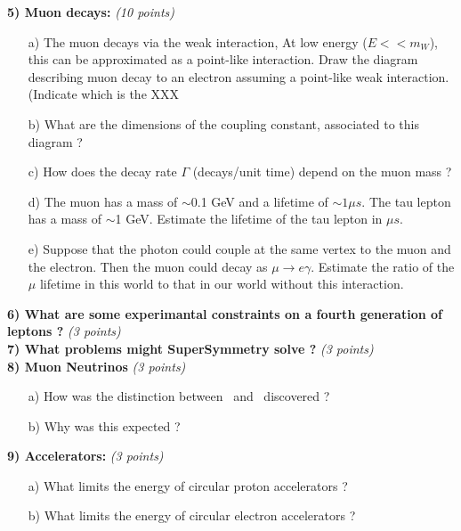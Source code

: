 {%

\textbf{5) Muon decays: } \hfill \textit{(10 points)}\\
\begin{itemize}
  \item[a)]{ The muon decays via the weak interaction,  At low energy ($E << m_W$), this can be approximated as a point-like interaction. 
  Draw the diagram describing muon decay to an electron assuming a point-like weak interaction. (Indicate which is the XXX
\vspace*{1.5in}
}
  \item[b)]{ What are the dimensions of the coupling constant, associated to this diagram  ?
\vspace*{1.0in}
  }
  \item[c)] How does the decay rate $\Gamma$ (decays/unit time)  depend on the muon mass ? 
\vspace*{1.0in}
  \item[d)]{ The muon has a mass of $\sim$0.1 GeV and a lifetime of $\sim 1 \mu s$. The tau lepton has a mass of {$\sim$1 GeV}. Estimate the lifetime of the tau lepton in $\mu s$.
\vspace*{2.4in}
}
  \item[e)] {Suppose that the photon could couple at the same vertex to the muon and the electron. Then the muon could decay as $\mu\rightarrow e \gamma$. 
  Estimate the ratio of the $\mu$ lifetime in this world to that in our world without this interaction.
  \vspace*{3.0in}
  }
\end{itemize}


\textbf{6) What are some experimantal constraints on a fourth generation of leptons ? } \hfill \textit{(3 points)}\\

\textbf{7) What problems might SuperSymmetry solve ? } \hfill \textit{(3 points)}\\


\textbf{8) Muon Neutrinos  } \hfill \textit{(3 points)}
\begin{itemize}
\item[a)]How was the distinction between \numu\ and \nue\ discovered ?
\item[b)]Why was this expected ?
\end{itemize}

\textbf{9) Accelerators: } \hfill \textit{(3 points)}
\begin{itemize}
\item[a)]What limits the energy of circular proton accelerators ?
\item[b)]What limits the energy of circular electron accelerators ?
\end{itemize}



}
